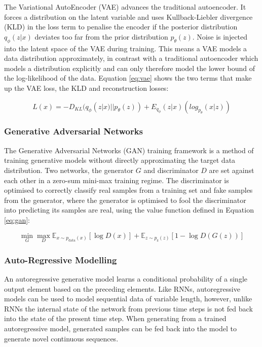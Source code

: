 The Variational AutoEncoder (VAE) \citep{kingma2013auto, rezende2014stochastic} advances the traditional autoencoder.
It forces a distribution on the latent variable and uses Kullback-Liebler divergence (KLD) in the loss term to penalise the encoder if the posterior distribution $q_{\phi}(z|x)$ deviates too far from the prior distribution $p_{\theta}(z)$. 
Noise is injected into the latent space of the VAE during training.
This means a VAE models a data distribution approximately, in contrast with a traditional autoencoder which models a distribution explicitly and can only therefore model the lower bound of the log-likelihood of the data. 
Equation \ref{eq:vae} shows the two terms that make up the VAE loss, the KLD and reconstruction losses:

\begin{equation}
\label{eq:vae}
L(x) = -D_{KL}(q_{\phi}(z|x)||p_{\theta}(z)) + E_{q_\phi}(z|x)(log_{p_{\theta}}(x|z))
\end{equation}

\subsubsection{Generative Adversarial Networks}

The Generative Adversarial Networks (GAN) training framework \citep{goodfellow2014generative} is a method of training generative models without directly approximating the target data distribution. 
Two networks, the generator $G$ and discriminator $D$ are set against each other in a zero-sum mini-max training regime. 
The discriminator is optimised to correctly classify real samples from a training set and fake samples from the generator, where the generator is optimised to fool the discriminator into predicting its samples are real, using the value function defined in Equation \ref{eq:gan}: 

\begin{equation}
\label{eq:gan}
\min_{G}\max_{D}\mathbb{E}_{x\sim p_{\text{data}}(x)}[\log{D(x)}] + \mathbb{E}_{z\sim p_{\text{z}}(z)}[1 - \log{D(G(z))}]
\end{equation}

\subsubsection{Auto-Regressive Modelling}
\label{c2:subsubsec:autoregressive}

An autoregressive generative model learns a conditional probability of a single output element based on the preceding elements. 
Like RNNs, autoregressive models can be used to model sequential data of variable length, however, unlike RNNs the internal state of the network from previous time steps is not fed back into the state of the present time step. 
When generating from a trained autoregressive model, generated samples can be fed back into the model to generate novel continuous sequences.

